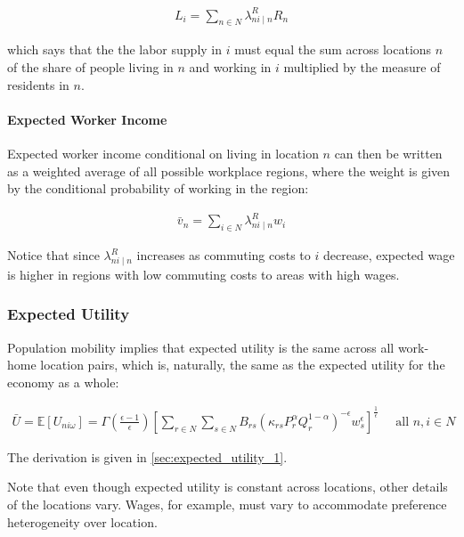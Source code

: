 \documentclass[10pt]{article}
\begin{document}
\begin{align}
    L_i=\sum_{n \in N} \lambda_{n i \mid n}^R R_n
\end{align}

which says that the 
the labor supply in $i$
must equal the sum across locations $n$ of 
the share of people living in $n$ 
and working in $i$ multiplied by
the measure of residents in $n$.

\paragraph{Expected Worker Income}

Expected worker income
conditional on living in location $n$ 
can then be written as a weighted 
average of all possible workplace regions,
where the weight is given by the conditional probability 
of working in the region:

\begin{align}
    \bar{v}_n=\sum_{i \in N} \lambda_{n i \mid n}^R w_i \label{eq:expected_worker_income}
\end{align}

Notice that since $\lambda_{n i \mid n}^R$ increases 
as commuting costs to $i$ decrease, expected 
wage is higher in regions with 
low commuting costs to areas with high wages.

\subsubsection{Expected Utility}

Population mobility implies 
that expected utility 
is the same across 
all work-home location pairs,
which is, naturally, the same as the expected 
utility for the economy as a whole:

\begin{align}
    \bar{U}=\mathbb{E}\left[U_{n i \omega}\right]=\Gamma\left(\frac{\epsilon-1}{\epsilon}\right)\left[\sum_{r \in N} \sum_{s \in N} B_{r s}\left(\kappa_{r s} P_r^\alpha Q_r^{1-\alpha}\right)^{-\epsilon} w_s^\epsilon\right]^{\frac{1}{\epsilon}} \quad \text { all } n, i \in N \label{eq:expected_utility_1}
\end{align}

The derivation is given in \autoref{sec:expected_utility_1}.

Note that even though expected utility 
is constant across locations, other 
details of the locations vary. 
Wages, for example, must vary to accommodate 
preference heterogeneity over location. 
\end{document}
